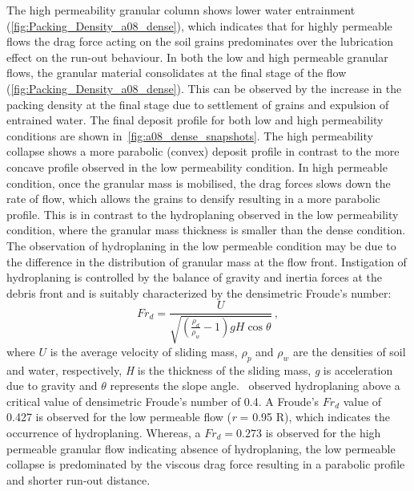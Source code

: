 The high permeability granular column shows 
lower water entrainment (\cref{fig:Packing_Density_a08_dense}), which 
indicates that for highly permeable flows the 
drag force acting on the soil grains predominates over the lubrication effect 
on the run-out behaviour. In both the low and high permeable granular flows, 
the granular material consolidates at the final stage of the flow 
(\cref{fig:Packing_Density_a08_dense}). This can be observed by the increase 
in the packing density at the final stage due to settlement of grains and 
expulsion of 
entrained water. The final deposit profile for both low and high permeability 
conditions are shown in~\cref{fig:a08_dense_snapshots}. The high permeability 
collapse shows a more parabolic (convex) deposit profile in contrast to the 
more concave profile observed in the low permeability condition. In high 
permeable 
condition, once the granular mass is mobilised, the drag forces slows down the 
rate of flow, which allows the grains to densify resulting in a more parabolic 
profile. This is in contrast to the hydroplaning observed in the low 
permeability 
condition, where the granular mass thickness is smaller than the dense 
condition. The observation of hydroplaning in the low permeable condition may 
be due to the difference in the distribution of granular mass at the flow 
front. Instigation of hydroplaning is controlled by the balance of gravity and 
inertia forces at the debris front and is suitably characterized by the 
densimetric Froude's number:
%
\begin{equation}
Fr_d = \frac{U}{\sqrt{(\frac{\rho_d}{\rho_w}-1)gH\cos\theta}} \,,
\end{equation}
where $U$ is the average velocity of sliding mass, $\rho_p$ and $\rho_w$ are 
the densities of soil and water, respectively, \textit{H} is the thickness of 
the sliding mass, \textit{g} is acceleration due to gravity and $\theta$ 
represents the slope angle.~\citet{Harbitz2003} observed 
hydroplaning above a critical value of densimetric Froude's number of 0.4. A 
Froude's $Fr_d$ value of 0.427 is observed for the low permeable flow 
(\textit{r} = 0.95 
R), which indicates the occurrence of hydroplaning. Whereas, a $Fr_d = 0.273$ 
is observed for the high permeable granular flow indicating absence of 
hydroplaning, the low 
permeable collapse is predominated by the viscous drag force resulting in a 
parabolic profile and shorter run-out distance. 
